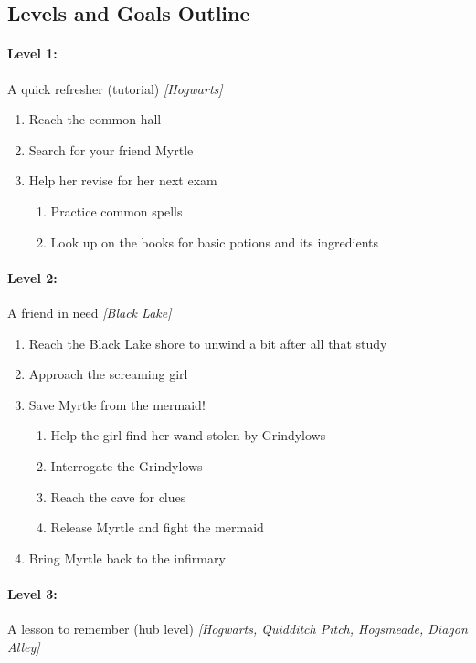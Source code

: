 \pagebreak

\subsection{Levels and Goals Outline}

\paragraph{Level 1:} A quick refresher (tutorial) \textit{[Hogwarts]}
\begin{enumerate}[1)]
	\item Reach the common hall
	\item Search for your friend Myrtle
	\item Help her revise for her next exam
	\begin{enumerate}[1.]
		\item Practice common spells
		\item Look up on the books for basic potions and its ingredients
	\end{enumerate}
\end{enumerate}

\paragraph{Level 2:} A friend in need \textit{[Black Lake]}
\begin{enumerate}[1)]
	\item Reach the Black Lake shore to unwind a bit after all that study
	\item Approach the screaming girl
	\item Save Myrtle from the mermaid!
	\begin{enumerate}[1.]
		\item Help the girl find her wand stolen by Grindylows
		\item Interrogate the Grindylows
		\item Reach the cave for clues
		\item Release Myrtle and fight the mermaid
	\end{enumerate}
	\item Bring Myrtle back to the infirmary
\end{enumerate}

\paragraph{Level 3:} A lesson to remember (hub level) \textit{[Hogwarts, Quidditch Pitch, Hogsmeade, Diagon Alley]}

